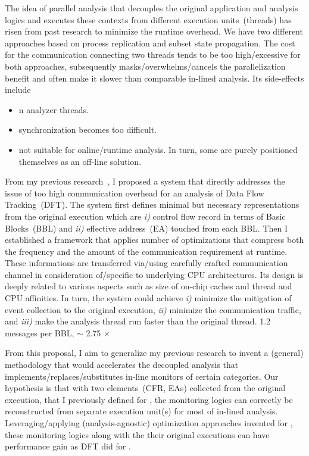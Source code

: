 The idea of parallel analysis that decouples the original application and
analysis logics and executes these contexts from different execution
units~(threads) has risen from past research to minimize the runtime overhead.  
%
We have two different approaches based on process replication and subset state
propagation.
%
The cost for the communication connecting two threads tends to be too
high/excessive for both approaches, subsequently masks/overwhelms/cancels the
parallelization benefit and often make it slower than comparable in-lined
analysis. Its side-effects include

\begin{itemize} \item n analyzer threads.  \item synchronization becomes too
difficult.  \item not suitable for online/runtime analysis. In turn, some are
purely positioned themselves as an off-line solution.  \end{itemize}

From my previous research~\cite{ShadowReplica, TFA, libdft}, I proposed a
system that directly addresses the issue of too high communication overhead for
an analysis of Data Flow Tracking~(DFT). The system first defines minimal but
necessary representations from the original execution which are {\it i)}
control flow record in terms of Basic Blocks~(BBL) and {\it ii)} effective
address~(EA) touched from each BBL. Then I established a framework that applies
number of optimizations that compress both the frequency and the amount of the
communication requirement at runtime. 
%
These informations are transferred via/using carefully crafted communication
channel in consideration of/specific to underlying CPU architectures. Its
design is deeply related to various aspects such as size of on-chip caches and
thread and CPU affinities.
%
In turn, the system could achieve {\it i)} minimize the mitigation of event
collection to the original execution, {\it ii)} minimize the communication
traffic, and {\it iii)} make the analysis thread run faster than the original
thread.
%
1.2 messages per BBL, $\sim$ 2.75 $\times$

From this proposal, I aim to generalize my previous research to invent a
(general) methodology that would accelerates the decoupled analysis that
implements/replaces/substitutes in-line monitors of certain categories.
%
Our hypothesis is that with two elements~(CFR, EAs) collected from the original
execution, that I previously defined for \SR, the monitoring logics can
correctly be reconstructed from separate execution unit(s) for most of in-lined
analysis. Leveraging/applying (analysis-agnostic) optimization approaches
invented for \SR, these monitoring logics along with the their original
executions can have performance gain as DFT did for \SR.

